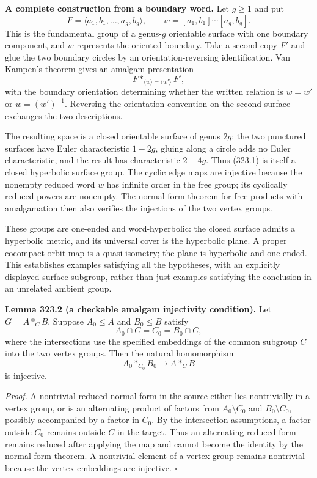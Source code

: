 \documentclass[11pt]{article}
\begin{document}
\textbf{A complete construction from a boundary word.} Let $g\geq1$ and put
\[
 F=\langle a_1,b_1,\ldots,a_g,b_g\rangle,
 \qquad w=[a_1,b_1]\cdots[a_g,b_g].
\]
This is the fundamental group of a genus-$g$ orientable surface with one boundary component, and $w$ represents the oriented boundary. Take a second copy $F'$ and glue the two boundary circles by an orientation-reversing identification. Van Kampen's theorem gives an amalgam presentation
\[
 F*_{\langle w\rangle=\langle w'\rangle}F',
 \tag{323.1}
\]
with the boundary orientation determining whether the written relation is $w=w'$ or $w=(w')^{-1}$. Reversing the orientation convention on the second surface exchanges the two descriptions.

The resulting space is a closed orientable surface of genus $2g$: the two punctured surfaces have Euler characteristic $1-2g$, gluing along a circle adds no Euler characteristic, and the result has characteristic $2-4g$. Thus (323.1) is itself a closed hyperbolic surface group. The cyclic edge maps are injective because the nonempty reduced word $w$ has infinite order in the free group; its cyclically reduced powers are nonempty. The normal form theorem for free products with amalgamation then also verifies the injections of the two vertex groups.

These groups are one-ended and word-hyperbolic: the closed surface admits a hyperbolic metric, and its universal cover is the hyperbolic plane. A proper cocompact orbit map is a quasi-isometry; the plane is hyperbolic and one-ended. This establishes examples satisfying all the hypotheses, with an explicitly displayed surface subgroup, rather than just examples satisfying the conclusion in an unrelated ambient group.

\textbf{Lemma 323.2 (a checkable amalgam injectivity condition).} Let $G=A*_C B$. Suppose $A_0\leq A$ and $B_0\leq B$ satisfy
\[
 A_0\cap C=C_0=B_0\cap C,
\]
where the intersections use the specified embeddings of the common subgroup $C$ into the two vertex groups. Then the natural homomorphism
\[
 A_0*_{C_0}B_0\longrightarrow A*_C B
\]
is injective.

\emph{Proof.} A nontrivial reduced normal form in the source either lies nontrivially in a vertex group, or is an alternating product of factors from $A_0\setminus C_0$ and $B_0\setminus C_0$, possibly accompanied by a factor in $C_0$. By the intersection assumptions, a factor outside $C_0$ remains outside $C$ in the target. Thus an alternating reduced form remains reduced after applying the map and cannot become the identity by the normal form theorem. A nontrivial element of a vertex group remains nontrivial because the vertex embeddings are injective. $\square$
\end{document}
